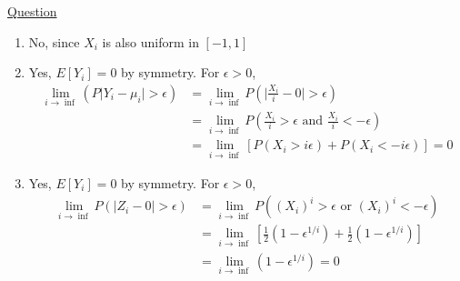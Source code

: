 \documentclass[../probability-notes.tex]{subfiles}
\begin{document}
\begin{enumerate}

        \hypertarget{a_convergence}{\item} \hyperlink{a_convergence}{Question}\newline
        \begin{enumerate}
            \item No, since $X_{i}$ is also uniform in $[-1,1]$
            \item Yes, $E[Y_{i}] = 0$ by symmetry. For $\epsilon > 0$,
            \begin{align*}
                \lim_{i \to \inf}(P\vert Y_{i} - \mu_{i} \vert > \epsilon) &= \lim_{i \to \inf} P(\vert \frac{X_{i}}{i} - 0 \vert > \epsilon)\\
                &= \lim_{i \to \inf} P(\frac{X_{i}}{i} > \epsilon \text{ and } \frac{X_{i}}{i} < -\epsilon)\\
                &= \lim_{i \to \inf} [P(X_{i} > i\epsilon) + P(X_{i} < -i\epsilon)] = 0
            \end{align*}
            \item Yes, $E[Y_{i}] = 0$ by symmetry. For $\epsilon > 0$,
            \begin{align*}
                \lim_{i \to \inf}P(\vert Z_{i} - 0 \vert > \epsilon) &= \lim_{i \to \inf}P((X_{i})^{i} > \epsilon \text{ or } (X_{i})^{i} < -\epsilon)\\
                &= \lim_{i \to \inf} [\frac{1}{2}(1 - \epsilon^{1/i}) + \frac{1}{2}(1 - \epsilon^{1/i})]\\
                &= \lim_{i \to \inf}(1 - \epsilon^{1/i}) = 0
            \end{align*}
        \end{enumerate}
    \end{enumerate}
\end{document}
